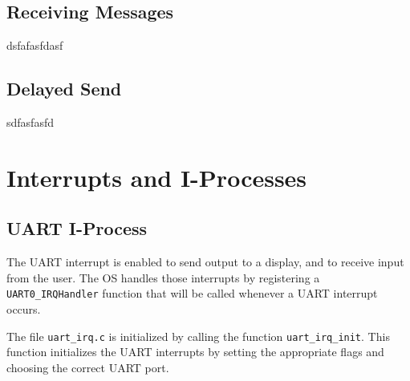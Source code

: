 \documentclass[12pt]{report}
\begin{document}
\subsection{Receiving Messages}

dsfafasfdasf

\subsection{Delayed Send}


sdfasfasfd


\section{Interrupts and I-Processes}

\subsection{UART I-Process}

The UART interrupt is enabled to send output to a display, and to receive input from the user. The OS handles those interrupts by registering a \texttt{UART0_IRQHandler} function that will be called whenever a UART interrupt occurs. 

The file \texttt{uart_irq.c} is initialized by calling the function \texttt{uart_irq_init}. This function initializes the UART interrupts by setting the appropriate flags and choosing the correct UART port. 
\end{document}
